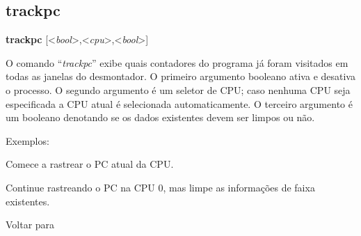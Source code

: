 \documentclass[letterpaper,10pt,brazil]{sphinxmanual}
\begin{document}
\subsection{trackpc}
\label{debugger/general:trackpc}\label{debugger/general:debugger-command-trackpc}
\begin{DUlineblock}{0em}
\item[]
\begin{DUlineblock}{\DUlineblockindent}
\item[] \textbf{trackpc} {[}\textless{}\emph{bool}\textgreater{},\textless{}\emph{cpu}\textgreater{},\textless{}\emph{bool}\textgreater{}{]}
\item[] 
\end{DUlineblock}
\item[] O comando ``\emph{trackpc}'' exibe quais contadores do programa já foram visitados em todas as janelas do desmontador. O primeiro argumento booleano ativa e desativa o processo. O segundo argumento é um seletor de CPU; caso nenhuma CPU seja especificada a CPU atual é selecionada automaticamente. O terceiro argumento é um booleano denotando se os dados existentes devem ser limpos ou não.
\item[] 
\item[] Exemplos:
\item[] 
\item[]
\begin{DUlineblock}{\DUlineblockindent}
\item[] 
\item[] 
\end{DUlineblock}
\item[] Comece a rastrear o PC atual da CPU.
\item[] 
\item[]
\begin{DUlineblock}{\DUlineblockindent}
\item[] 
\item[] 
\end{DUlineblock}
\item[] Continue rastreando o PC na CPU 0, mas limpe as informações de faixa existentes.
\item[] 
\item[] Voltar para {\hyperref[debugger/general:debugger\string-general\string-list]{}}
\end{DUlineblock}
\begin{quote}
\label{debugger/general:debugger-command-trackmem}\end{quote}
\end{document}
